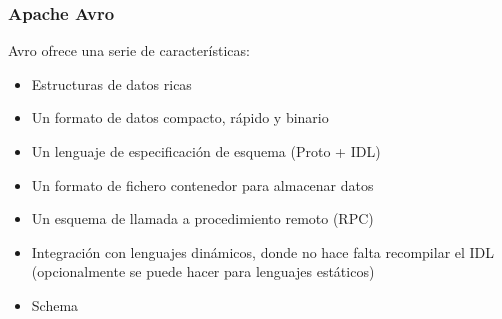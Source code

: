 \subsubsection{Apache Avro}
Avro ofrece una serie de características:
\begin{itemize}
	\item Estructuras de datos ricas
	\item Un formato de datos compacto, rápido y binario
	\item Un lenguaje de especificación de esquema (Proto + IDL)
	\item Un formato de fichero contenedor para almacenar datos
	\item Un esquema de llamada a procedimiento remoto (RPC)
	\item Integración con lenguajes dinámicos, donde no hace falta recompilar el IDL (opcionalmente se puede hacer para lenguajes estáticos)
\end{itemize}
\begin{itemize}[label=\color{red}\textbullet, leftmargin=*]
	\item \color{lightblue}Schema
\end{itemize}

